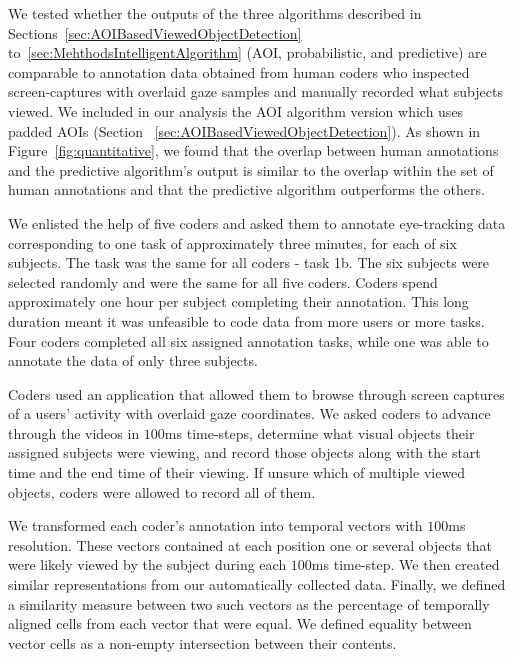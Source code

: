 We tested whether the outputs of the three algorithms described in Sections~\ref{sec:AOIBasedViewedObjectDetection} to~\ref{sec:MehthodsIntelligentAlgorithm} (AOI, probabilistic, and predictive) are comparable to annotation data obtained from human coders who inspected screen-captures with overlaid gaze samples and manually recorded what subjects viewed. We included in our analysis the AOI algorithm version which uses padded AOIs (Section ~\ref{sec:AOIBasedViewedObjectDetection}). As shown in Figure~\ref{fig:quantitative}, we found that the overlap between human annotations and the predictive algorithm's output is similar to the overlap within the set of human annotations and that the predictive algorithm outperforms the others. 

We enlisted the help of five coders and asked them to annotate eye-tracking data corresponding to one task of approximately three minutes, for each of six subjects.  The task was the same for all coders - task 1b. The six subjects were selected randomly and were the same for all five coders. Coders spend approximately one hour per subject completing their annotation. This long duration meant it was unfeasible to code data from more users or more tasks. Four coders completed all six assigned annotation tasks, while one was able to annotate the data of only three subjects. 

Coders used an application that allowed them to browse through screen captures of a users' activity with overlaid gaze coordinates. We asked coders to advance through the videos in $100$ms time-steps, determine what visual objects their assigned subjects were viewing, and record those objects along with the start time and the end time of their viewing. If unsure which of multiple viewed objects, coders were allowed to record all of them.  

We transformed each coder's annotation into temporal vectors with $100$ms resolution. These vectors contained at each position one or several objects that were likely viewed by the subject during each $100$ms time-step. We then created similar representations from our automatically collected data. Finally, we defined a similarity measure between two such vectors as the percentage of temporally aligned cells from each vector that were equal. We defined equality between vector cells as a non-empty intersection between their contents.  


